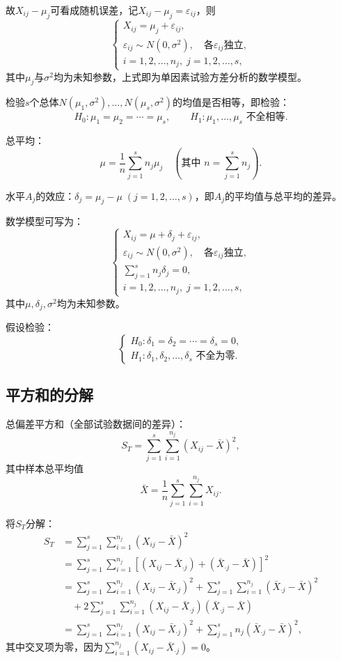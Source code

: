 \documentclass[11pt,a4paper]{report}
\theoremstyle{definition}
\begin{document}
故$X_{ij}-\mu_{j}$可看成随机误差，记$X_{ij}-\mu_{j}=\varepsilon_{ij}$，则
\[
\begin{cases}
X_{ij}=\mu_{j}+\varepsilon_{ij},\\[0.3em]
\varepsilon_{ij}\sim N(0,\sigma^{2}),\quad\text{各}\varepsilon_{ij}\text{独立},\\[0.3em]
i=1,2,\ldots,n_{j},\;j=1,2,\ldots,s,
\end{cases}
\]
其中$\mu_{j}$与$\sigma^{2}$均为未知参数，上式即为单因素试验方差分析的数学模型。

检验$s$个总体$N(\mu_{1},\sigma^{2}),\ldots,N(\mu_{s},\sigma^{2})$的均值是否相等，即检验：
\[
H_{0}\colon\mu_{1}=\mu_{2}=\cdots=\mu_{s},\qquad H_{1}\colon\mu_{1},\ldots,\mu_{s}\text{ 不全相等}.
\]

总平均：
\[
\mu=\frac{1}{n}\sum_{j=1}^{s}n_{j}\mu_{j}\quad\left(\text{其中 }n=\sum_{j=1}^{s}n_{j}\right).
\]

水平$A_{j}$的效应：$\delta_{j}=\mu_{j}-\mu\;(j=1,2,\ldots,s)$，即$A_{j}$的平均值与总平均的差异。

数学模型可写为：
\[
\begin{cases}
X_{ij}=\mu+\delta_{j}+\varepsilon_{ij},\\[0.3em]
\varepsilon_{ij}\sim N(0,\sigma^{2}),\quad\text{各}\varepsilon_{ij}\text{独立},\\[0.3em]
\displaystyle\sum_{j=1}^{s}n_{j}\delta_{j}=0,\\[0.5em]
i=1,2,\ldots,n_{j},\;j=1,2,\ldots,s,
\end{cases}
\]
其中$\mu,\delta_{j},\sigma^{2}$均为未知参数。

假设检验：
\[
\begin{cases}
H_{0}\colon\delta_{1}=\delta_{2}=\cdots=\delta_{s}=0,\\[0.3em]
H_{1}\colon\delta_{1},\delta_{2},\ldots,\delta_{s}\text{ 不全为零}.
\end{cases}
\]

\subsection{平方和的分解}

总偏差平方和（全部试验数据间的差异）：
\[
S_{T}=\sum_{j=1}^{s}\sum_{i=1}^{n_{j}}(X_{ij}-\bar{X})^{2},
\]
其中样本总平均值
\[
\bar{X}=\frac{1}{n}\sum_{j=1}^{s}\sum_{i=1}^{n_{j}}X_{ij}.
\]

将$S_{T}$分解：
\[
\begin{aligned}
S_{T}&=\sum_{j=1}^{s}\sum_{i=1}^{n_{j}}(X_{ij}-\bar{X})^{2}\\
&=\sum_{j=1}^{s}\sum_{i=1}^{n_{j}}\left[(X_{ij}-\bar{X}_{\cdot j})+(\bar{X}_{\cdot j}-\bar{X})\right]^{2}\\
&=\sum_{j=1}^{s}\sum_{i=1}^{n_{j}}(X_{ij}-\bar{X}_{\cdot j})^{2}+\sum_{j=1}^{s}\sum_{i=1}^{n_{j}}(\bar{X}_{\cdot j}-\bar{X})^{2}\\
&\quad+2\sum_{j=1}^{s}\sum_{i=1}^{n_{j}}(X_{ij}-\bar{X}_{\cdot j})(\bar{X}_{\cdot j}-\bar{X})\\
&=\sum_{j=1}^{s}\sum_{i=1}^{n_{j}}(X_{ij}-\bar{X}_{\cdot j})^{2}+\sum_{j=1}^{s}n_{j}(\bar{X}_{\cdot j}-\bar{X})^{2},
\end{aligned}
\]
其中交叉项为零，因为$\displaystyle\sum_{i=1}^{n_{j}}(X_{ij}-\bar{X}_{\cdot j})=0$。
\end{document}
